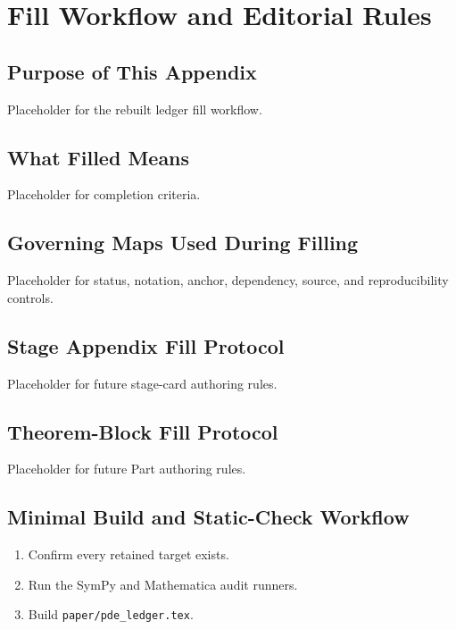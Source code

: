 \chapter{Fill Workflow and Editorial Rules}
\label{app:fill-workflow}

\providecommand{\WorkflowFile}[1]{\begingroup\footnotesize\nolinkurl{#1}\endgroup}
\providecommand{\WorkflowGate}[1]{\textbf{#1}}

\section{Purpose of This Appendix}
\label{sec:fill-workflow-purpose}

Placeholder for the rebuilt ledger fill workflow.

\section{What Filled Means}
\label{sec:fill-definition}

Placeholder for completion criteria.

\section{Governing Maps Used During Filling}
\label{sec:fill-governing-maps}

Placeholder for status, notation, anchor, dependency, source, and reproducibility controls.

\section{Stage Appendix Fill Protocol}
\label{sec:stage-appendix-fill-protocol}

Placeholder for future stage-card authoring rules.

\section{Theorem-Block Fill Protocol}
\label{sec:theorem-block-fill-protocol}

Placeholder for future Part authoring rules.

\section{Minimal Build and Static-Check Workflow}
\label{sec:minimal-build-static-check-workflow}

\begin{enumerate}[leftmargin=2.4em]
  \item Confirm every retained \verb|| target exists.
  \item Run the SymPy and Mathematica audit runners.
  \item Build \WorkflowFile{paper/pde_ledger.tex}.
\end{enumerate}
